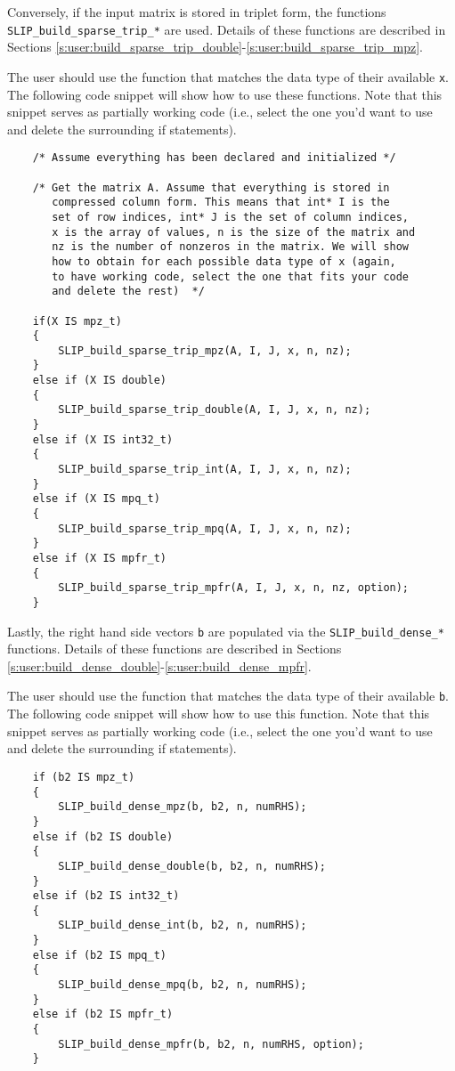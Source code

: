 \documentclass[12pt]{article}
\theoremstyle{definition}
\begin{document}
Conversely, if the input matrix is stored in triplet form, the functions \\
\verb|SLIP_build_sparse_trip_*| are used. Details of these functions are
described in Sections
\ref{s:user:build_sparse_trip_double}-\ref{s:user:build_sparse_trip_mpz}.

The user should use the function that matches the data type of their available
\verb|x|. The following code snippet will show how to use these functions. Note
that this snippet serves as partially working code (i.e., select the one you'd
want to use and delete the surrounding if statements).

{\small
    \begin{verbatim}
    /* Assume everything has been declared and initialized */

    /* Get the matrix A. Assume that everything is stored in
       compressed column form. This means that int* I is the
       set of row indices, int* J is the set of column indices,
       x is the array of values, n is the size of the matrix and
       nz is the number of nonzeros in the matrix. We will show
       how to obtain for each possible data type of x (again,
       to have working code, select the one that fits your code
       and delete the rest)  */

    if(X IS mpz_t)
    {
        SLIP_build_sparse_trip_mpz(A, I, J, x, n, nz);
    }
    else if (X IS double)
    {
        SLIP_build_sparse_trip_double(A, I, J, x, n, nz);
    }
    else if (X IS int32_t)
    {
        SLIP_build_sparse_trip_int(A, I, J, x, n, nz);
    }
    else if (X IS mpq_t)
    {
        SLIP_build_sparse_trip_mpq(A, I, J, x, n, nz);
    }
    else if (X IS mpfr_t)
    {
        SLIP_build_sparse_trip_mpfr(A, I, J, x, n, nz, option);
    } \end{verbatim} }

Lastly, the right hand side vectors \verb|b| are populated via the
\verb|SLIP_build_dense_*| functions. Details of these functions are described
in Sections \ref{s:user:build_dense_double}-\ref{s:user:build_dense_mpfr}.

The user should use the function that matches the data type of their available
\verb|b|. The following code snippet will show how to use this function. Note
that this snippet serves as partially working code (i.e., select the one you'd
want to use and delete the surrounding if statements).

{\small
    \begin{verbatim}
    if (b2 IS mpz_t)
    {
        SLIP_build_dense_mpz(b, b2, n, numRHS);
    }
    else if (b2 IS double)
    {
        SLIP_build_dense_double(b, b2, n, numRHS);
    }
    else if (b2 IS int32_t)
    {
        SLIP_build_dense_int(b, b2, n, numRHS);
    }
    else if (b2 IS mpq_t)
    {
        SLIP_build_dense_mpq(b, b2, n, numRHS);
    }
    else if (b2 IS mpfr_t)
    {
        SLIP_build_dense_mpfr(b, b2, n, numRHS, option);
    } \end{verbatim} }
\end{document}
